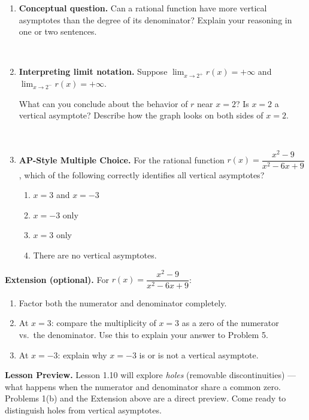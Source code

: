 \documentclass[10pt]{article}
\begin{document}
\begin{enumerate}[itemsep=14pt]
\item \textbf{Conceptual question.} Can a rational function have more vertical asymptotes than
      the degree of its denominator? Explain your reasoning in one or two sentences.

\vspace{0.3in}
\writeline\\[4pt]
\writeline

\item \textbf{Interpreting limit notation.} Suppose $\displaystyle\lim_{x \to 2^+} r(x) = +\infty$
      and $\displaystyle\lim_{x \to 2^-} r(x) = +\infty$.

      What can you conclude about the behavior of $r$ near $x = 2$? Is $x = 2$ a vertical
      asymptote? Describe how the graph looks on both sides of $x = 2$.

\vspace{0.3in}
\writeline\\[4pt]
\writeline

\item \textbf{AP-Style Multiple Choice.} For the rational function
$r(x) = \dfrac{x^2 - 9}{x^2 - 6x + 9}$, which of the following correctly identifies all
vertical asymptotes?

\begin{enumerate}[label=(\Alph*), itemsep=3pt]
  \item $x = 3$ and $x = -3$
  \item $x = -3$ only
  \item $x = 3$ only
  \item There are no vertical asymptotes.
\end{enumerate}

\end{enumerate}

\vspace{0.1in}

\begin{extensionbox}
\textbf{Extension (optional).} For $r(x) = \dfrac{x^2 - 9}{x^2 - 6x + 9}$:
\begin{enumerate}[label=(\alph*), itemsep=4pt]
  \item Factor both the numerator and denominator completely.
  \item At $x = 3$: compare the multiplicity of $x = 3$ as a zero of the numerator vs.\ the
        denominator. Use this to explain your answer to Problem 5.
  \item At $x = -3$: explain why $x = -3$ is or is not a vertical asymptote.
\end{enumerate}
\end{extensionbox}

\vspace{0.1in}

\begin{reflectionbox}
\textbf{Lesson Preview.} Lesson 1.10 will explore \textit{holes} (removable discontinuities)
--- what happens when the numerator and denominator share a common zero. Problems 1(b) and
the Extension above are a direct preview. Come ready to distinguish holes from vertical asymptotes.
\end{reflectionbox}
\end{document}
